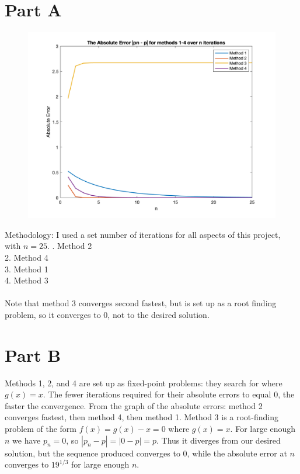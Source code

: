 \documentclass[11pt, oneside]{article}   	%
\date{}							%
\begin{document}
\section*{Part A}

\begin{figure}
\begin{flushright}
\includegraphics [scale=.25] {Plot_Abs_Error.png}
\end{flushright}
\end{figure}

Methodology: I used a set number of iterations for all aspects of this project, with $n = 25$.
. Method 2\\
2. Method 4\\
3. Method 1\\
4. Method 3\\
$~~$\\
Note that method 3 converges second fastest, but is set up as a root finding problem, so it converges to 0, not to the desired solution.\\ 

\section*{Part B}

Methods 1, 2, and 4 are set up as fixed-point problems: they search for where $g(x) = x$. The fewer iterations required for their absolute errors to equal 0, the faster the convergence. From the graph of the absolute errors: method 2 converges fastest, then method 4, then method 1. Method 3 is a root-finding problem of the form $f(x) = g(x) - x = 0$ where $g(x) = x$. For large enough $n$ we have $p_n = 0$, so $|p_n - p| = | 0 - p | = p$. Thus it diverges from our desired solution, but the sequence produced converges to 0, while the absolute error at $n$ converges to $19^{1/3}$ for large enough $n$.
\end{document}
